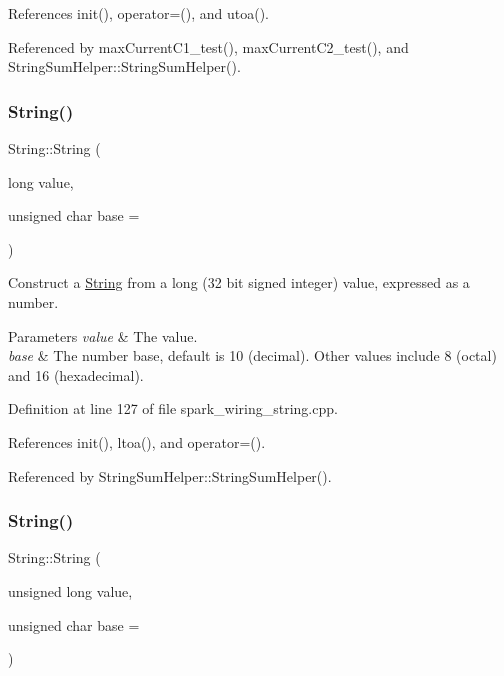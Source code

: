 References init(), operator=(), and utoa().



Referenced by max\+Current\+C1\+\_\+test(), max\+Current\+C2\+\_\+test(), and String\+Sum\+Helper\+::\+String\+Sum\+Helper().

\mbox{\label{class_string_a868687056546919b7109c0801d75ec83}} 
\subsubsection{\texorpdfstring{String()}{String()}\hspace{0.1cm}{\footnotesize\ttfamily [10/13]}}
{\footnotesize\ttfamily String\+::\+String (\begin{DoxyParamCaption}\item[{long}]{value,  }\item[{unsigned char}]{base = {} }\end{DoxyParamCaption})\hspace{0.3cm}{\ttfamily [explicit]}}



Construct a \hyperlink{class_string}{String} from a long (32 bit signed integer) value, expressed as a number. 


\begin{DoxyParams}{Parameters}
{\em value} & The value.\\
\hline
{\em base} & The number base, default is 10 (decimal). Other values include 8 (octal) and 16 (hexadecimal). \\
\hline
\end{DoxyParams}


Definition at line 127 of file spark\+\_\+wiring\+\_\+string.\+cpp.



References init(), ltoa(), and operator=().



Referenced by String\+Sum\+Helper\+::\+String\+Sum\+Helper().

\mbox{\label{class_string_abdad234c756b44cce55c75db24fddecf}} 
\subsubsection{\texorpdfstring{String()}{String()}\hspace{0.1cm}{\footnotesize\ttfamily [11/13]}}
{\footnotesize\ttfamily String\+::\+String (\begin{DoxyParamCaption}\item[{unsigned long}]{value,  }\item[{unsigned char}]{base = {} }\end{DoxyParamCaption})\hspace{0.3cm}{\ttfamily [explicit]}}



